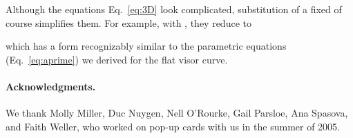 \pdfoutput=1  \documentclass[]{article}
\newcommand{\eqnref}[1]{\ref{eq:#1}}
\begin{document}
Although the equations Eq.~\eqnref{3D} look complicated, substitution of a fixed 
of course simplifies them.
For example, with , they reduce to

which has a form recognizably similar to the parametric equations (Eq.~\eqnref{aprime}) we derived for the
flat visor curve.
















\paragraph{Acknowledgments.}\label{Ack}
We thank
Molly Miller,
Duc Nuygen,
Nell O'Rourke,
Gail Parsloe,
Ana Spasova, and
Faith Weller,
who worked on pop-up cards with us in the summer of 2005.






\end{document}
